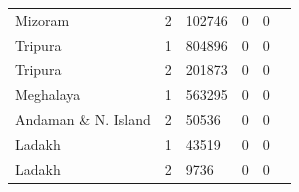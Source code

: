\documentclass{article}
\begin{document}
\begin{table}[h!]
{\begin{tabular}{|l|l|l|r|r|r|}
		Mizoram                        & 2 & 102746   & 0       & 0     \\
		Tripura                        & 1 & 804896   & 0       & 0     \\
		Tripura                        & 2 & 201873   & 0       & 0     \\
		Meghalaya                      & 1 & 563295   & 0       & 0     \\
		Andaman \& N. Island           & 2 & 50536    & 0       & 0     \\
		Ladakh                         & 1 & 43519    & 0       & 0     \\
		Ladakh                         & 2 & 9736     & 0       & 0    \\
		\hline
	\end{tabular}
}
\end{table}
\end{document}
